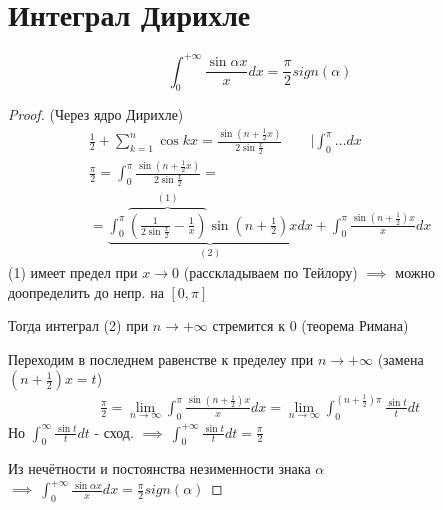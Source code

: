 \documentclass{article}
\begin{document}
\section{Интеграл Дирихле}
\begin{lemma}
  \[
    \int_{0}^{+\infty}\frac{\sin \alpha x}{x}dx=\frac{\pi}{2} sign(\alpha)
  \]
\end{lemma}
\begin{proof}
  (Через ядро Дирихле)
  \begin{gather*}
    \frac{1}{2}+\sum_{k=1}^{n}\cos kx = \frac{\sin(n+\frac{1}{2}x)}{2\sin \frac{x}{2}} \qquad \Big|\int_{0}^{\pi}\dots dx \\ 
    \frac{\pi}{2}=\int_{0}^{\pi}\frac{\sin(n+\frac{1}{2}x)}{2\sin \frac{x}{2}} = \\
    = \underbrace{\int_{0}^{\pi}\overbrace{\left(\frac{1}{2\sin \frac{x}{2}}-\frac{1}{x}\right)}^{(1)}\sin(n+\frac{1}{2})xdx}_{(2)} + \int_{0}^{\pi}\frac{\sin (n+\frac{1}{2})x}{x}dx
  \end{gather*}
  (1) имеет предел при $x\to 0$ (расскладываем по Тейлору) $\implies$ можно доопределить до непр. на $[0,\pi]$ 

  Тогда интеграл (2) при $n\to +\infty$ стремится к 0 (теорема Римана)

  Переходим в последнем равенстве к пределеу при $n\to+\infty$ (замена $(n+\frac{1}{2})x=t$)
  \begin{gather*}
    \frac{\pi}{2}=\lim_{n\to \infty}\int_{0}^{\pi}\frac{\sin(n+\frac{1}{2})x}{x}dx=\lim_{n\to\infty}\int_{0}^{(n+\frac{1}{2})\pi}\frac{\sin t}{t}dt
  \end{gather*}
  Но $\int_{0}^{\infty}\frac{\sin t}{t}dt$ - сход. $\implies \ \int_{0}^{+\infty}\frac{\sin t}{t}dt=\frac{\pi}{2}$

  Из нечётности и постоянства незименности знака $\alpha$ $\implies \ \int_{0}^{+\infty}\frac{\sin \alpha x}{x}dx = \frac{\pi}{2}sign(\alpha)$
\end{proof}
\end{document}
